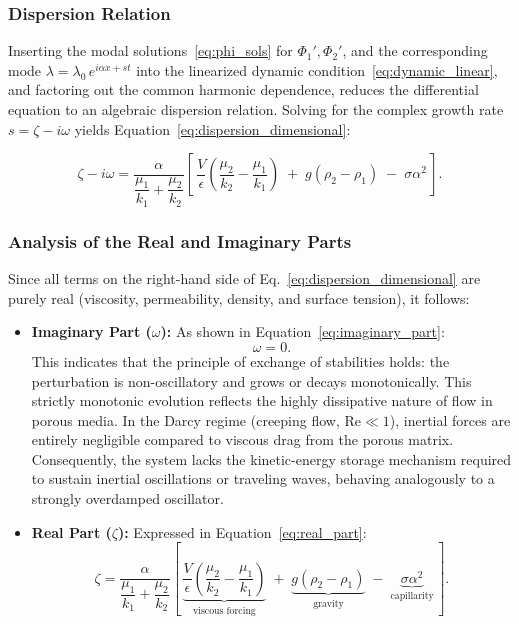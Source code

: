\subsubsection{Dispersion Relation}

Inserting the modal solutions~\eqref{eq:phi_sols} for $\Phi_1', \Phi_2'$, and the corresponding mode $\lambda = \lambda_0\,e^{i\alpha x + st}$ into the linearized dynamic condition~\eqref{eq:dynamic_linear}, and factoring out the common harmonic dependence, reduces the differential equation to an algebraic dispersion relation. Solving for the complex growth rate $s = \zeta - i\omega$ yields Equation~\ref{eq:dispersion_dimensional}:

\begin{equation} \label{eq:dispersion_dimensional}
    \zeta - i\omega = \frac{\alpha}{\dfrac{\mu_1}{k_1} + \dfrac{\mu_2}{k_2}}
    \left[\, \frac{V}{\epsilon}\!\left( \frac{\mu_2}{k_2} - \frac{\mu_1}{k_1} \right)
    \;+\; g(\rho_2 - \rho_1) \;-\; \sigma \alpha^2 \,\right].
\end{equation}

\subsubsection{Analysis of the Real and Imaginary Parts}

Since all terms on the right-hand side of Eq.~\ref{eq:dispersion_dimensional} are purely real (viscosity, permeability, density, and surface tension), it follows:

\begin{itemize}
    \item \textbf{Imaginary Part ($\omega$):} As shown in Equation~\ref{eq:imaginary_part}:
    \begin{equation} \label{eq:imaginary_part}
        \omega = 0.
    \end{equation}
    This indicates that the principle of exchange of stabilities holds: the perturbation is non-oscillatory and grows or decays monotonically. This strictly monotonic evolution reflects the highly dissipative nature of flow in porous media. In the Darcy regime (creeping flow, $\mathrm{Re} \ll 1$), inertial forces are entirely negligible compared to viscous drag from the porous matrix. Consequently, the system lacks the kinetic-energy storage mechanism required to sustain inertial oscillations or traveling waves, behaving analogously to a strongly overdamped oscillator.

    \item \textbf{Real Part ($\zeta$):} Expressed in Equation~\ref{eq:real_part}:
    \begin{equation} \label{eq:real_part}
        \zeta = \frac{\alpha}{\dfrac{\mu_1}{k_1} + \dfrac{\mu_2}{k_2}}
        \left[\, \underbrace{\frac{V}{\epsilon}\!\left( \frac{\mu_2}{k_2} - \frac{\mu_1}{k_1} \right)}_{\text{viscous forcing}}
        \;+\; \underbrace{g(\rho_2 - \rho_1)}_{\text{gravity}}
        \;-\; \underbrace{\sigma \alpha^2}_{\text{capillarity}} \,\right].
    \end{equation}
\end{itemize}

